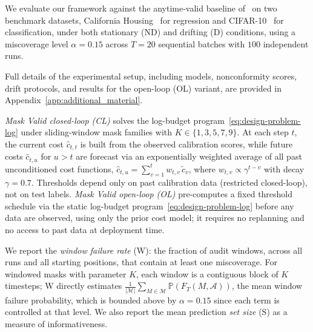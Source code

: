\documentclass{uai2026} %
\newcommand{\1}{\mathbf{1}}
\newcommand{\prob}{\mathbb{P}}
\newcommand{\mcal}{\mathcal{M}}
\newcommand{\acal}{\mathcal{A}}
\begin{document}


We evaluate our framework against the anytime-valid baseline of~\citet{gauthier2025values} on two benchmark datasets, California Housing~\citep{california_housing} for regression and CIFAR-10~\citep{cifar10} for classification, under both stationary (ND) and drifting  (D) conditions, using a miscoverage level $\alpha = 0.15$ across $T = 20$ sequential batches with $100$ independent runs. 

Full details of the experimental setup, including models, nonconformity scores, drift protocols, and results for the open-loop (OL) variant, are provided in Appendix~\ref {app:additional_material}.

\emph{Mask Valid closed-loop (CL)} solves the log-budget program~\eqref{eq:design-problem-log} under sliding-window mask families with $K \in \{1, 3, 5, 7, 9\}$.
At each step $t$, the current cost $\hat{c}_{t,t}$ is built from the observed calibration scores, while future costs $\hat{c}_{t,u}$ for $u > t$ are forecast via an exponentially weighted average of all past unconditioned cost functions, $\hat{c}_{t,u} = \sum_{v=1}^{t} w_{t,v}\, \tilde{c}_v$, where $w_{t,v} \propto \gamma^{t-v}$ with decay $\gamma = 0.7$.
Thresholds depend only on past calibration data (restricted closed-loop), not on test labels.
\emph{Mask Valid open-loop (OL)} pre-computes a fixed threshold schedule via the static log-budget program~\eqref{eq:design-problem-log} before any data are observed, using only the prior cost model; it requires no replanning and no access to past data at deployment time.

We report the \emph{window failure rate} (W): the fraction of audit windows, across all runs and all starting positions, that contain at least one miscoverage.
For windowed masks with parameter $K$, each window is a contiguous block of $K$ timesteps; W directly estimates $\frac{1}{|\mcal|}\sum_{M \in \mcal}
\prob(F_T(M, \acal))$, the mean window failure probability, which is bounded
above by $\alpha = 0.15$ since each term is controlled at that level.
We also report the mean prediction \emph{set size} (S) as a measure of informativeness.
\end{document}
